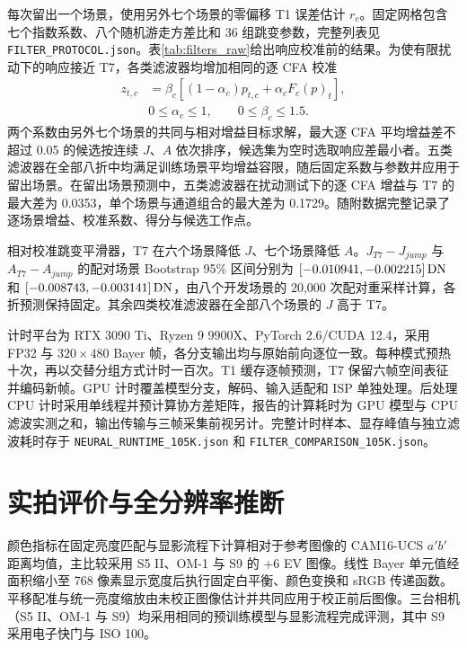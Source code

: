 每次留出一个场景，使用另外七个场景的零偏移 T1 误差估计 $r_c$。固定网格包含七个指数系数、八个随机游走方差比和 36 组跳变参数，完整列表见 \texttt{FILTER\_PROTOCOL.json}。表\ref{tab:filters_raw}给出响应校准前的结果。为使有限扰动下的响应接近 T7，各类滤波器均增加相同的逐 CFA 校准
\begin{equation}
 \begin{aligned}
 z_{t,c}&=\beta_c[(1-\alpha_c)p_{t,c}+\alpha_cF_c(p)_t],\\
 &0\le\alpha_c\le1,\qquad0\le\beta_c\le1.5.
\end{aligned}
\end{equation}
两个系数由另外七个场景的共同与相对增益目标求解，最大逐 CFA 平均增益差不超过 0.05 的候选按连续 $J$、$A$ 依次排序，候选集为空时选取响应差最小者。五类滤波器在全部八折中均满足训练场景平均增益容限，随后固定系数与参数并应用于留出场景。在留出场景预测中，五类滤波器在扰动测试下的逐 CFA 增益与 T7 的最大差为 0.0353，单个场景与通道组合的最大差为 0.1729。随附数据完整记录了逐场景增益、校准系数、得分与候选工作点。



相对校准跳变平滑器，T7 在六个场景降低 $J$、七个场景降低 $A$。$J_{T7}-J_{jump}$ 与 $A_{T7}-A_{jump}$ 的配对场景 Bootstrap 95\% 区间分别为 $[-0.010941,-0.002215]\,\mathrm{DN}$ 和 $[-0.008743,-0.003141]\,\mathrm{DN}$，由八个开发场景的 20,000 次配对重采样计算，各折预测保持固定。其余四类校准滤波器在全部八个场景的 $J$ 高于 T7。

计时平台为 RTX 3090 Ti、Ryzen 9 9900X、PyTorch 2.6/CUDA 12.4，采用 FP32 与 $320\times480$ Bayer 帧，各分支输出均与原始前向逐位一致。每种模式预热十次，再以交替分组方式计时一百次。T1 缓存逐帧预测，T7 保留六帧空间表征并编码新帧。GPU 计时覆盖模型分支，解码、输入适配和 ISP 单独处理。后处理 CPU 计时采用单线程并预计算协方差矩阵，报告的计算耗时为 GPU 模型与 CPU 滤波实测之和，输出传输与三帧采集前视另计。完整计时样本、显存峰值与独立滤波耗时存于 \texttt{NEURAL\_RUNTIME\_105K.json} 和 \texttt{FILTER\_COMPARISON\_105K.json}。

\section{实拍评价与全分辨率推断}
颜色指标在固定亮度匹配与显影流程下计算相对于参考图像的 CAM16-UCS $a'b'$ 距离均值，主比较采用 S5 II、OM-1 与 S9 的 +6 EV 图像。线性 Bayer 单元值经面积缩小至 768 像素显示宽度后执行固定白平衡、颜色变换和 sRGB 传递函数。平移配准与统一亮度缩放由未校正图像估计并共同应用于校正前后图像。三台相机（S5 II、OM-1 与 S9）均采用相同的预训练模型与显影流程完成评测，其中 S9 采用电子快门与 ISO 100。

